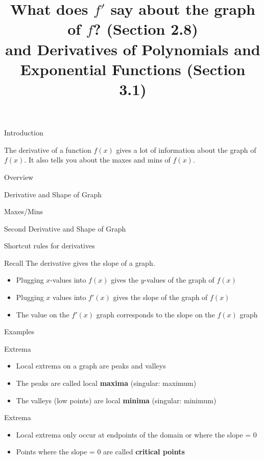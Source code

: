 \documentclass[t]{beamer}
\title{What does $f'$ say about the graph of $f$?  (Section 2.8) \\
and Derivatives of Polynomials and Exponential Functions (Section 3.1)}
\date{}
\newenvironment{fpi}
  {\itemize[nolistsep,itemsep=\fill]}
  {\vfill\enditemize}
\begin{document}
\frame{\titlepage}

\begin{frame}{Introduction}
\begin{fpi}
\item The derivative of a function $f(x)$ gives a lot of information about the graph of $f(x)$.  It also tells you about the maxes and mins of $f(x)$.
\end{fpi}
\end{frame}

\begin{frame}{Overview}
\begin{fpi}
\item Derivative and Shape of Graph
\item Maxes/Mins
\item Second Derivative and Shape of Graph
\item Shortcut rules for derivatives
\end{fpi}
\end{frame}

\begin{frame}{Recall}
The derivative gives the slope of a graph.
\begin{itemize}
\item Plugging $x$-values into $f(x)$ gives the $y$-values of the graph of $f(x)$
\item Plugging $x$ values into $f'(x)$ gives the slope of the graph of $f(x)$
\item The value on the $f'(x)$ graph corresponds to the slope on the $f(x)$ graph
\end{itemize}
\end{frame}

\begin{frame}{Examples}
\end{frame}

\begin{frame}{Extrema}
\begin{itemize}
\item Local extrema on a graph are peaks and valleys
\item The peaks are called local \textbf{maxima} (singular: maximum)
\item The valleys (low points) are local \textbf{minima} (singular: minimum)
\end{itemize}
\end{frame}

\begin{frame}{Extrema}
\begin{itemize}
\item Local extrema only occur at endpoints of the domain or
where the slope = 0
\item Points where the slope = 0 are called \textbf{critical points}
\end{itemize}
\end{frame}
\end{document}
